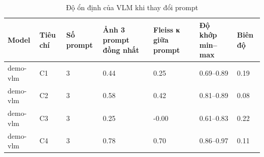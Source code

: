 \begin{table}[t]
\centering
\caption{Độ ổn định của VLM khi thay đổi prompt}
\footnotesize
\begin{tabular}{lllllll}
\hline
Model & Tiêu chí & Số prompt & Ảnh 3 prompt đồng nhất & Fleiss κ giữa prompt & Độ khớp min–max & Biên độ \\
\hline
demo-vlm & C1 & 3 & 0.44 & 0.25 & 0.69–0.89 & 0.19 \\
demo-vlm & C2 & 3 & 0.58 & 0.42 & 0.81–0.89 & 0.08 \\
demo-vlm & C3 & 3 & 0.25 & -0.00 & 0.61–0.83 & 0.22 \\
demo-vlm & C4 & 3 & 0.78 & 0.70 & 0.86–0.97 & 0.11 \\
\hline
\end{tabular}
\end{table}
